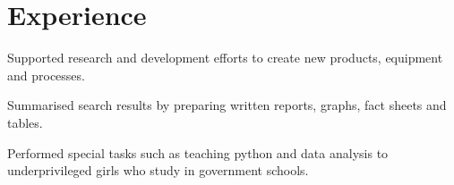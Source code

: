 \documentclass[]{deedy-resume-reversed}
\begin{document}
%
%

%
%

%
%

\begin{minipage}[t]{0.60\textwidth}


\section{Experience}
\vspace{\topsep} %
\begin{tightemize}
\item Supported research and development efforts to create new products, equipment and processes.
\item Summarised search results by preparing written reports, graphs, fact sheets and tables.
\end{tightemize}
\sectionsep

\begin{tightemize}
\item Performed special tasks such as teaching python and data analysis to underprivileged girls
who study in government schools.

\end{tightemize}
\sectionsep



\end{minipage}
\end{document}
